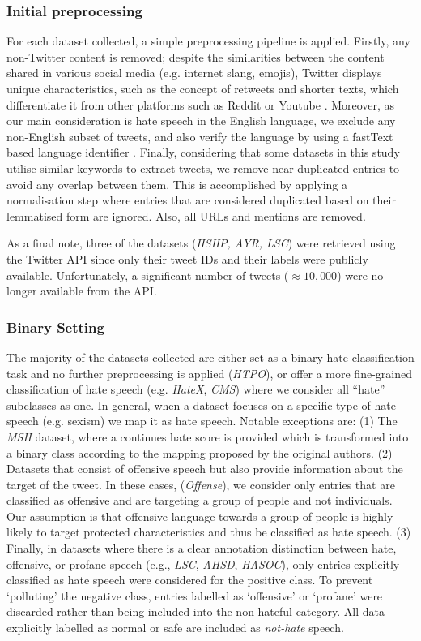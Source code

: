         \subsubsection{Initial preprocessing}
        For each dataset collected, a simple preprocessing pipeline is applied. Firstly, any non-Twitter content is removed; despite the similarities between the content shared in various social media (e.g. internet slang, emojis), Twitter displays unique characteristics, such as the concept of retweets and shorter texts, which differentiate it from other platforms such as Reddit or Youtube \cite{smith2012does}. 
        Moreover, as our main consideration is hate speech in the English language, we exclude any non-English subset of tweets, and also verify the language by using a fastText based language identifier \cite{bojanowski2017enriching}. Finally, considering that some datasets in this study utilise similar keywords to extract tweets, we remove near duplicated entries to avoid any overlap between them. This is accomplished by applying a normalisation step where entries that are considered duplicated based on their lemmatised form are ignored. Also, all URLs and mentions are removed.

        As a final note, three of the datasets (\textit{HSHP, AYR, LSC}) were retrieved using the Twitter \ac{API} since only their tweet IDs and their labels were publicly available. Unfortunately, a significant number of tweets ($\approx10,000$) were no longer available from the \ac{API}.

      
        \subsubsection{Binary Setting}
        The majority of the datasets collected are either set as a binary hate classification task and no further preprocessing is applied (\textit{HTPO}), or offer a more fine-grained classification of hate speech (e.g. \textit{HateX}, \textit{CMS}) where we consider all ``hate'' subclasses as one. In general, when a dataset focuses on a specific type of hate speech (e.g. sexism) we map it as hate speech. Notable exceptions are: (1) The \textit{MSH} dataset, where a continues hate score is provided which is  transformed into a binary class according to the mapping proposed by the original authors. (2) Datasets that consist of offensive speech but also provide information about the target of the tweet. In these cases, (\textit{Offense}), we consider only entries that are classified as offensive and are targeting a group of people and not individuals. Our assumption is that offensive language towards a group of people is highly likely to target protected characteristics and thus be classified as hate speech. (3) Finally, in datasets where there is a clear annotation distinction between hate, offensive, or profane speech (e.g., \textit{LSC}, \textit{AHSD}, \textit{HASOC}), only entries explicitly classified as hate speech were considered for the positive class. To prevent `polluting' the negative class, entries labelled as `offensive' or `profane' were discarded rather than being included into the non-hateful category. All data explicitly labelled as normal or safe are included as \textit{not-hate} speech.


